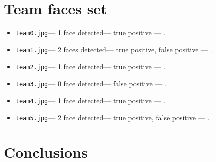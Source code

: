 \documentclass[12pt,a4paper,twocolumn]{article}
\begin{document}
\section*{Team faces set}
\begin{itemize}
\item \texttt{team0.jpg}--- 1 face detected--- true positive --- .
\item \texttt{team1.jpg}--- 2 faces detected--- true positive, false positive --- .
\item \texttt{team2.jpg}--- 1 face detected--- true positive --- .
\item \texttt{team3.jpg}--- 0 face detected--- false positive --- .
\item \texttt{team4.jpg}--- 1 face detected--- true positive --- .
\item \texttt{team5.jpg}--- 2 face detected--- true positive, false positive --- .
\end{itemize}

\section*{Conclusions}
\lipsum[1]
\end{document}
